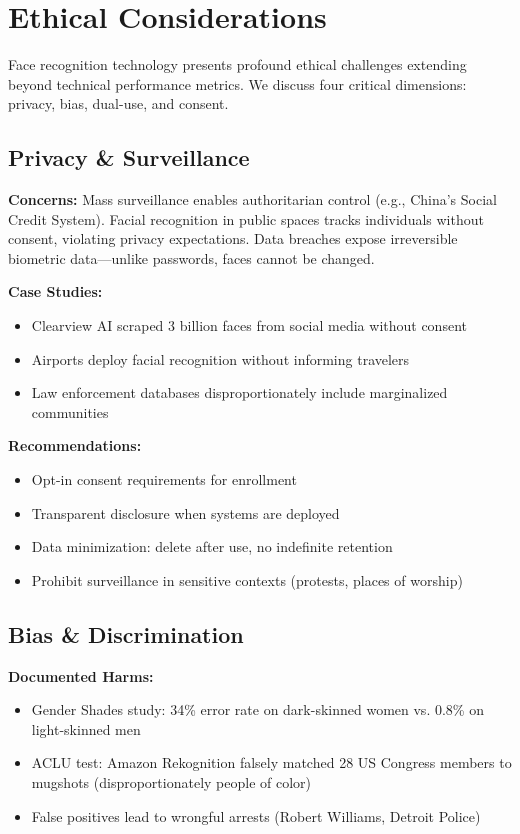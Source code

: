 \documentclass[11pt,a4paper]{article}
\begin{document}
\section{Ethical Considerations}

Face recognition technology presents profound ethical challenges extending beyond technical performance metrics. We discuss four critical dimensions: privacy, bias, dual-use, and consent.

\subsection{Privacy \& Surveillance}

\textbf{Concerns:} Mass surveillance enables authoritarian control (e.g., China's Social Credit System). Facial recognition in public spaces tracks individuals without consent, violating privacy expectations. Data breaches expose irreversible biometric data—unlike passwords, faces cannot be changed.

\textbf{Case Studies:}
\begin{itemize}
    \item Clearview AI scraped 3 billion faces from social media without consent
    \item Airports deploy facial recognition without informing travelers
    \item Law enforcement databases disproportionately include marginalized communities
\end{itemize}

\textbf{Recommendations:}
\begin{itemize}
    \item Opt-in consent requirements for enrollment
    \item Transparent disclosure when systems are deployed
    \item Data minimization: delete after use, no indefinite retention
    \item Prohibit surveillance in sensitive contexts (protests, places of worship)
\end{itemize}

\subsection{Bias \& Discrimination}

\textbf{Documented Harms:}
\begin{itemize}
    \item Gender Shades study: 34\% error rate on dark-skinned women vs. 0.8\% on light-skinned men \cite{buolamwini2018gender}
    \item ACLU test: Amazon Rekognition falsely matched 28 US Congress members to mugshots (disproportionately people of color)
    \item False positives lead to wrongful arrests (Robert Williams, Detroit Police)
\end{itemize}
\end{document}
